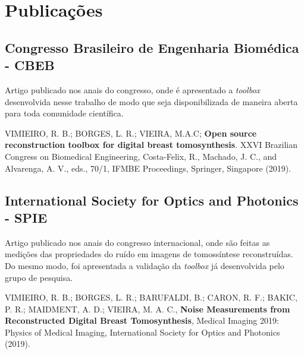 \chapter[Publicações]{Publicações}\label{Capitulo9}

\section{Congresso Brasileiro de Engenharia Biomédica - CBEB}

Artigo publicado nos anais do congresso, onde é apresentado a \textit{toolbox} desenvolvida nesse trabalho de modo que seja disponibilizada de maneira aberta para toda comunidade científica.

VIMIEIRO, R. B.; BORGES, L. R.; VIEIRA, M.A.C; \textbf{Open source reconstruction toolbox for digital breast tomosynthesis}. XXVI Brazilian Congress on Biomedical Engineering, Costa-Felix, R., Machado,
J. C., and Alvarenga, A. V., eds., 70/1, IFMBE Proceedings, Springer, Singapore (2019).


\section{International Society for Optics and Photonics - SPIE}

Artigo publicado nos anais do congresso internacional, onde são feitas as medições das propriedades do ruído em imagens de tomossíntese reconstruídas. Do mesmo modo, foi apresentada a validação da \textit{toolbox} já desenvolvida pelo grupo de pesquisa.

VIMIEIRO, R. B.; BORGES, L. R.; BARUFALDI, B.; CARON, R. F.; BAKIC, P. R.; MAIDMENT, A. D.; VIEIRA, M. A. C., \textbf{Noise Measurements from Reconstructed Digital Breast Tomosynthesis}, Medical
Imaging 2019: Physics of Medical Imaging, International Society for Optics and Photonics
(2019).

